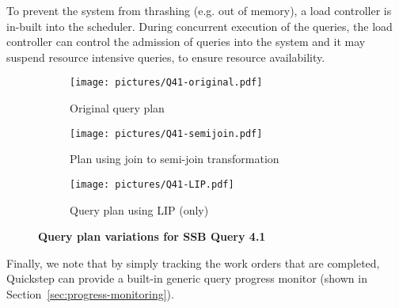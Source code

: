 To prevent the system from thrashing (e.g. out of memory), a load controller is in-built into the scheduler.
During concurrent execution of the queries, the load controller can control the admission of queries into the system and it may suspend resource intensive queries, to ensure resource availability.  %

\begin{figure*}[t]
\centering
\begin{subfigure}[bt]{0.33\textwidth}
  \centering
   \texttt{[image: pictures/Q41-original.pdf]}
   \caption{Original query plan}
   \label{fig-q41-original}
\end{subfigure} %
\begin{subfigure}[bt]{0.33\textwidth}
  \centering
   \texttt{[image: pictures/Q41-semijoin.pdf]}
   \caption{Plan using join to semi-join transformation}
   \label{fig-q41-semijoin}
\end{subfigure} %
\begin{subfigure}[bt]{0.33\textwidth}
  \centering
   \texttt{[image: pictures/Q41-LIP.pdf]}
   \caption{Query plan using LIP (only)}
   \label{fig-q41-lip}
\end{subfigure} %
\caption{\textbf{Query plan variations for SSB Query 4.1}}
\vspace*{2em}
\end{figure*}

Finally, we note that by simply tracking the work orders that are completed, Quickstep can provide a built-in generic query progress monitor (shown in Section~\ref{sec:progress-monitoring}).

